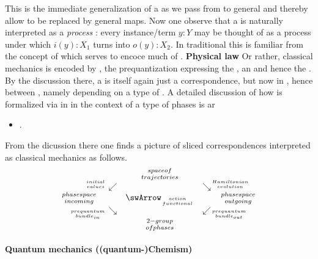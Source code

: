 \documentclass[12pt,titlepage]{article}
\def\mathllap{\mathpalette\mathllapinternal}
\def\mathrlap{\mathpalette\mathrlapinternal}
\def\mathllapinternal#1#2{\llap{$\mathsurround=0pt#1{#2}$}}
\def\mathrlapinternal#1#2{\rlap{$\mathsurround=0pt#1{#2}$}}
\newcommand{\itexarray}[1]{\begin{matrix}#1\end{matrix}}
\theoremstyle{plain}
\theoremstyle{definition}
\theoremstyle{remark}
\begin{document}
This is the immediate generalization of a  as we pass from  to general  and thereby allow  to be replaced by general maps.
Now one observe that a  is naturally interpreted as a \emph{process} :
every instance/term $y\colon Y$ may be thought of as a process under which $i(y) \colon X_1$ turns into $o(y) \colon X_2$.
In traditional  this is familiar from the concept of  which serves to encoce much of .
\textbf{Physical law}
Or rather, classical mechanics is encoded by , the prequantization expressing the , an  and hence the .
By the discussion there, a  is itself again just a correspondence, but now in , hence between , namely depending on a type of .
A detailed discussion of how  is formalized via  in  in the context of a type of phases is ar
\begin{itemize}%
\item {}.
\end{itemize}
From the dicussion there one finds a picture of sliced correspondences interpreted as classical mechanics as follows.
\begin{displaymath}
\itexarray{
&& {{spaceof} \atop {trajectories}}
\\
& {}^{\mathllap{{initial}\atop {values}}}\swarrow && \searrow^{\mathrlap{{Hamiltonian} \atop {evolution}}}
\\
{{phasespace} \atop {incoming}}
&& \swArrow_{{action} \atop {functional}} && {{phasespace} \atop {outgoing}}
\\
& {}_{\mathllap{{prequantum}\atop {bundle}_{in}}}\searrow
&&
\swarrow_{\mathrlap{{prequantum} \atop {bundle}_{out}}}
\\
&& {{2-group} \atop {ofphases}}
}
\end{displaymath}
\hypertarget{quantum_mechanics_quantumchemism}{}\paragraph*{{Quantum mechanics ((quantum-)Chemism)}}\label{quantum_mechanics_quantumchemism}
\end{document}
